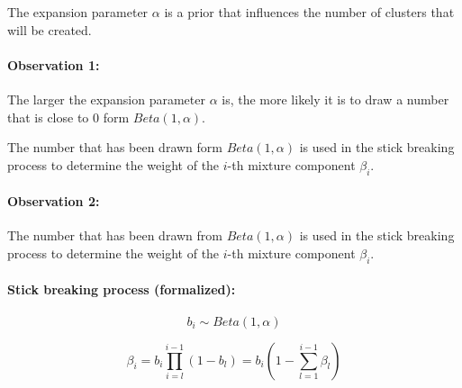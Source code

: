 The expansion parameter $\alpha$ is a prior that influences the number of clusters that will be created.

\paragraph{Observation 1:}
The larger the expansion parameter $\alpha$ is, the more likely it is to draw a number that is close to $0$ form $Beta(1,\alpha)$.

The number that has been drawn form $Beta(1,\alpha)$ is used in the stick breaking process to determine the weight of the $i$-th mixture component $\beta_i$.

\paragraph{Observation 2:}
The number that has been drawn from \(Beta(1,\alpha)\) is used in the stick breaking process to determine the weight of the \(i\)-th mixture component \(\beta_i\).

\paragraph{Stick breaking process (formalized):}

\begin{equation*}
	b_i \sim Beta(1,\alpha)
\end{equation*}

\begin{equation*}
	\beta_i = b_i \prod\limits_{i=l}^{i-1}(1-b_l) = b_i \left(1 - \sum_{l=1}^{i-1} \beta_l\right)
\end{equation*}
